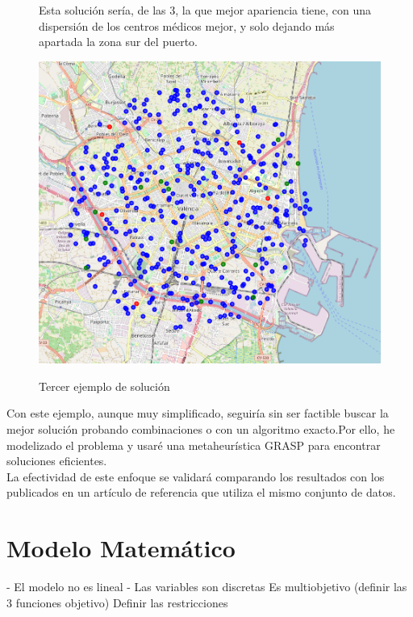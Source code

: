\documentclass[12pt,a4paper]{book}
\begin{document}
\begin{figure}[H]
    \centering
    \begin{minipage}[c]{0.45\textwidth}
        Esta solución sería, de las 3, la que mejor apariencia tiene, con una dispersión de los centros médicos mejor, y solo dejando más apartada la zona sur del puerto.
    \end{minipage}
    \hfill
    \begin{minipage}[c]{0.45\textwidth}
        \includegraphics[width=\textwidth]{images/solucion_ejemplo_3.png}
        \label{fig:ejemplo_3}
    \end{minipage}
    \caption{Tercer ejemplo de solución}
\end{figure}

 Con este ejemplo, aunque muy simplificado, seguiría sin ser factible buscar la mejor solución probando combinaciones
 o con un algoritmo exacto.Por ello, he modelizado el problema y usaré una metaheurística GRASP para encontrar soluciones eficientes.\\
 La efectividad de este enfoque se validará comparando los resultados con los publicados en un artículo de referencia que utiliza el mismo conjunto de datos.

\section{Modelo Matemático}
- El modelo no es lineal
- Las variables son discretas
Es multiobjetivo (definir las 3 funciones objetivo)
Definir las restricciones
\end{document}
